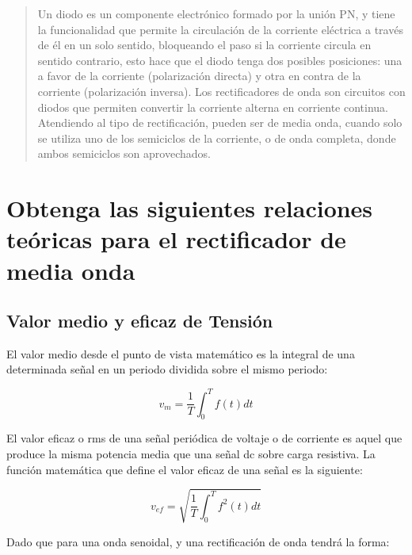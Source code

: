 \documentclass[a4paper]{article} %
\begin{document}
\newpage


\begin{abstract}
	Un diodo es un componente electrónico formado por la unión PN, y tiene la funcionalidad que permite la circulación de la corriente eléctrica a través de él en un solo sentido, bloqueando el paso si la corriente circula en sentido contrario, esto hace que el diodo tenga dos posibles posiciones: una a favor de la corriente (polarización directa) y otra en contra de la corriente (polarización inversa). Los rectificadores de onda son circuitos con diodos que permiten convertir la corriente alterna en corriente continua.
	Atendiendo al tipo de rectificación, pueden ser de media onda, cuando solo se utiliza uno de los semiciclos de la corriente, o de onda completa, donde ambos semiciclos son aprovechados.
\end{abstract}
	
\newpage
	
\section{Obtenga las siguientes relaciones teóricas para el rectificador de media onda}
\label{concepto}



\subsection{Valor medio y eficaz de Tensión}

El valor medio desde el punto de vista matemático es la integral de una determinada señal en un periodo dividida sobre el mismo periodo:

\begin{equation}
	v_m = \frac{1}{T} \int_{0}^{T} f(t) dt
\end{equation}

El valor eficaz o rms de una señal periódica de voltaje o de corriente es aquel que produce la misma potencia media que una señal dc sobre carga resistiva. La función matemática que define el valor eficaz de una señal es la siguiente:

\begin{equation}
	v_{ef} = \sqrt{\frac{1}{T} \int_{0}^{T} f^2 (t) dt}
\end{equation}

Dado que para una onda senoidal, y una rectificación de onda tendrá la forma: 
\end{document}
